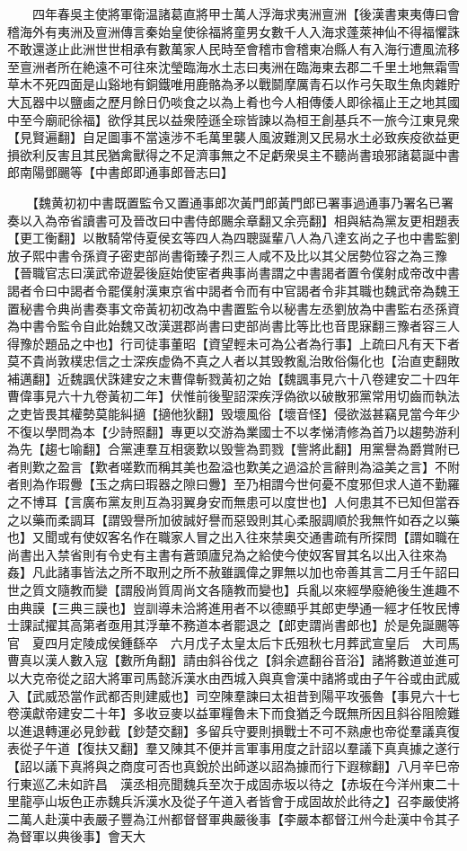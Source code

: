 　　四年春吳主使將軍衛温諸葛直將甲士萬人浮海求夷洲亶洲【後漢書東夷傳曰會稽海外有夷洲及亶洲傳言秦始皇使徐福將童男女數千人入海求蓬萊神仙不得福懼誅不敢還遂止此洲世世相承有數萬家人民時至會稽市會稽東冶縣人有入海行遭風流移至亶洲者所在絶遠不可往來沈瑩臨海水土志曰夷洲在臨海東去郡二千里土地無霜雪草木不死四面是山谿地有銅鐵唯用鹿骼為矛以戰鬬摩厲青石以作弓矢取生魚肉雜貯大瓦器中以鹽鹵之歷月餘日仍啖食之以為上肴也今人相傳倭人即徐福止王之地其國中至今廟祀徐福】欲俘其民以益衆陸遜全琮皆諫以為桓王創基兵不一旅今江東見衆【見賢遍翻】自足圖事不當遠涉不毛萬里襲人風波難測又民易水土必致疾疫欲益更損欲利反害且其民猶禽獸得之不足濟事無之不足虧衆吳主不聽尚書琅邪諸葛誕中書郎南陽鄧颺等【中書郎即通事郎晉志曰】

　　【魏黄初初中書既置監令又置通事郎次黃門郎黃門郎已署事過通事乃署名已署奏以入為帝省讀書可及晉改曰中書侍郎颺余章翻又余亮翻】相與結為黨友更相題表【更工衡翻】以散騎常侍夏侯玄等四人為四聰誕輩八人為八達玄尚之子也中書監劉放子熙中書令孫資子密吏部尚書衛臻子烈三人咸不及比以其父居勢位容之為三豫【晉職官志曰漢武帝遊晏後庭始使宦者典事尚書謂之中書謁者置令僕射成帝改中書謁者令曰中謁者令罷僕射漢東京省中謁者令而有中官謁者令非其職也魏武帝為魏王置秘書令典尚書奏事文帝黃初初改為中書置監令以秘書左丞劉放為中書監右丞孫資為中書令監令自此始魏又改漢選郡尚書曰吏部尚書比等比也音毘寐翻三豫者容三人得豫於題品之中也】行司徒事董昭【資望輕未可為公者為行事】上疏曰凡有天下者莫不貴尚敦樸忠信之士深疾虚偽不真之人者以其毁教亂治敗俗傷化也【治直吏翻敗補邁翻】近魏諷伏誅建安之末曹偉斬戮黃初之始【魏諷事見六十八卷建安二十四年曹偉事見六十九卷黃初二年】伏惟前後聖詔深疾浮偽欲以破散邪黨常用切齒而執法之吏皆畏其權勢莫能糾擿【擿他狄翻】毁壞風俗【壞音怪】侵欲滋甚竊見當今年少不復以學問為本【少詩照翻】專更以交游為業國士不以孝悌清修為首乃以趨勢游利為先【趨七喻翻】合黨連羣互相褒歎以毁訾為罰戮【訾將此翻】用黨譽為爵賞附已者則歎之盈言【歎者嗟歎而稱其美也盈溢也歎美之過溢於言辭則為溢美之言】不附者則為作瑕釁【玉之病曰瑕器之隙曰釁】至乃相謂今世何憂不度邪但求人道不勤羅之不博耳【言廣布黨友則互為羽翼身安而無患可以度世也】人何患其不已知但當吞之以藥而柔調耳【謂毁譽所加彼誠好譽而惡毁則其心柔服調順於我無忤如吞之以藥也】又聞或有使奴客名作在職家人冒之出入往來禁奥交通書疏有所探問【謂如職在尚書出入禁省則有令史有主書有蒼頭廬兒為之給使今使奴客冒其名以出入往來為姦】凡此諸事皆法之所不取刑之所不赦雖諷偉之罪無以加也帝善其言二月壬午詔曰世之質文隨教而變【謂殷尚質周尚文各隨教而變也】兵亂以來經學廢絶後生進趣不由典謨【三典三謨也】豈訓導未洽將進用者不以德顯乎其郎吏學通一經才任牧民博士課試擢其高第者亟用其浮華不務道本者罷退之【郎吏謂尚書郎也】於是免誕颺等官　夏四月定陵成侯鍾繇卒　六月戊子太皇太后卞氏殂秋七月葬武宣皇后　大司馬曹真以漢人數入寇【數所角翻】請由斜谷伐之【斜余遮翻谷音浴】諸將數道並進可以大克帝從之詔大將軍司馬懿泝漢水由西城入與真會漢中諸將或由子午谷或由武威入【武威恐當作武都否則建威也】司空陳羣諫曰太祖昔到陽平攻張魯【事見六十七卷漢獻帝建安二十年】多收豆麥以益軍糧魯未下而食猶乏今既無所因且斜谷阻險難以進退轉運必見鈔截【鈔楚交翻】多留兵守要則損戰士不可不熟慮也帝從羣議真復表從子午道【復扶又翻】羣又陳其不便并言軍事用度之計詔以羣議下真真據之遂行【詔以議下真將與之商度可否也真銳於出師遂以詔為據而行下遐稼翻】八月辛巳帝行東巡乙未如許昌　漢丞相亮聞魏兵至次于成固赤坂以待之【赤坂在今洋州東二十里龍亭山坂色正赤魏兵泝漢水及從子午道入者皆會于成固故於此待之】召李嚴使將二萬人赴漢中表嚴子豐為江州都督督軍典嚴後事【李嚴本都督江州今赴漢中令其子為督軍以典後事】會天大